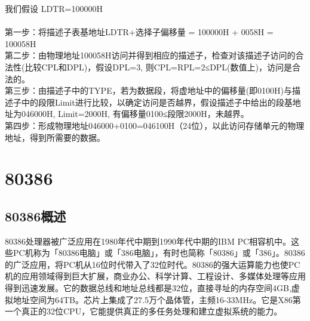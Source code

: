 \documentclass[12pt]{article}
\begin{document}
我们假设 LDTR=100000H\\\\
第一步：将描述子表基地址LDTR+选择子偏移量 = 100000H + 0058H = 100058H\\
第二步：由物理地址100058H访问并得到相应的描述子，检查对该描述子访问的合法性(比较CPL和DPL)，假设DPL=3, 则CPL=RPL=2≤DPL(数值上)，访问是合法的。\\
第三步：由描述子中的TYPE，若为数据段，将虚地址中的偏移量(即0100H)与描述子中的段限Limit进行比较，以确定访问是否越界，假设描述子中给出的段基地址为046000H, Limit=2000H, 有偏移量0100≤段限2000H，未越界。\\
第四步：形成物理地址046000+0100=046100H（24位），以此访问存储单元的物理地址，得到所需要的数据。
\section{80386}
\subsection{80386概述}
80386处理器被广泛应用在1980年代中期到1990年代中期的IBM PC相容机中。这些PC机称为「80386电脑」或「386电脑」，有时也简称「80386」或「386」。80386的广泛应用，将PC机从16位时代带入了32位时代。80386的强大运算能力也使PC机的应用领域得到巨大扩展，商业办公、科学计算、工程设计、多媒体处理等应用得到迅速发展。它的数据总线和地址总线都是32位，直接寻址的内存空间4GB,虚拟地址空间为64TB。芯片上集成了27.5万个晶体管，主频16-33MHz。它是X86第一个真正的32位CPU，它能提供真正的多任务处理和建立虚拟系统的能力。
\end{document}
